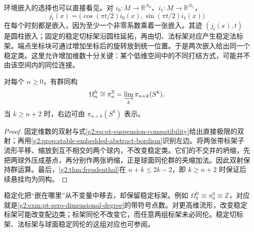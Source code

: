 环境嵌入的选择也可以直接看见。对 \(i_0:M\to\mathbb R^{N_0}\)、\(i_1:M\to\mathbb R^{N_1}\)，
\[
	j_t(x)=\bigl(\cos(\pi t/2)i_0(x),\sin(\pi t/2)i_1(x)\bigr)
\]
在每个时刻都是嵌入，因为至少一个非零系数乘着一张嵌入。其迹 \((j_t(x),t)\) 是圆柱嵌入；固定的稳定切标架沿圆柱延拓，再由切、法标架对应产生稳定法标架。端点坐标块可通过增加坐标后的旋转放到统一位置。于是两次嵌入给出同一个稳定类。这里允许增加维数十分关键：某个低维空间中的不同打结方式，可能并不由该空间内的同位连接。

\begin{theorem}\label{g2:thm:stable-pontryagin-thom}
	对每个 \(n\ge0\)，有群同构
	\[
		\Omega_n^{\mathrm{fr}}\cong\pi_n^{\mathrm S}
		=\varinjlim_k\pi_{n+k}(S^k).
	\]
	当 \(k\ge n+2\) 时，右边可由 \(\pi_{n+k}(S^k)\) 表示。
\end{theorem}
\begin{proof}
	固定维数的双射与式\eqref{g2:eq:pt-suspension-compatibility}给出直接极限的双射；再用\cref{g2:prop:stable-embedded-abstract-bordism}识别左边。将两张带标架子流形平移、缩放到互不相交的两个球内，不改变稳定类。它们的不交并的坍缩，先把两球外压成基点，再分别作两张坍缩，正是球面同伦群的夹缩加法。因此双射保持群运算。最后，\cref{g2:thm:freudenthal}在 \(n+k\le2k-2\)，即 \(k\ge n+2\) 时保证后续悬挂均为同构。
\end{proof}

稳定化把“嵌在哪里”从不变量中移去，却保留稳定标架。例如 \(\Omega_0^{\mathrm{fr}}\cong\pi_0^{\mathrm S}\cong\mathbb Z\)，对应就是\cref{g2:exm:pt-zero-dimensional-degree}的带符号点数。对更高维流形，改变稳定标架可能改变配边类；标架同伦不改变它，而任意两组标架未必同伦。稳定切标架、法标架与球面稳定同伦的这组对应也可参阅\cite[第1讲第5节，命题1.73及推论1.74]{Freed2019FieldTheory}。
